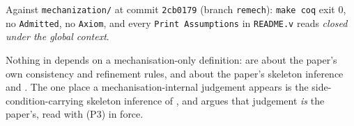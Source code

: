 \documentclass[11pt,a4paper]{article}
\theoremstyle{definition}
\newcommand{\coq}[1]{\texttt{\small #1}}
\begin{document}
\noindent
Against \coq{mechanization/} at commit \coq{2cb0179} (branch
\coq{remech}): \coq{make coq} exit 0, no \texttt{Admitted}, no
\texttt{Axiom}, and every \texttt{Print Assumptions} in \coq{README.v}
reads \emph{closed under the global context}.

\medskip\noindent
Nothing in  depends on a
mechanisation-only definition:  are about
the paper's own consistency and refinement rules, and
 about the paper's
skeleton inference and .  The one place a
mechanisation-internal judgement appears is the
side-condition-carrying skeleton inference of
, and  argues that
judgement \emph{is} the paper's, read with (P3) in force.
\end{document}
